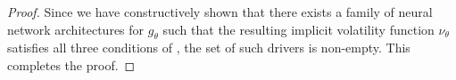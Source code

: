 \documentclass[10pt,a4paper]{amsart}
\begin{document}
\begin{proof}
Since we have constructively shown that there exists a family of neural network architectures for $g_\theta$ such that the resulting implicit volatility function $\nu_\theta$ satisfies all three conditions of , the set of such drivers is non-empty. This completes the proof.
\end{proof}
\end{document}
